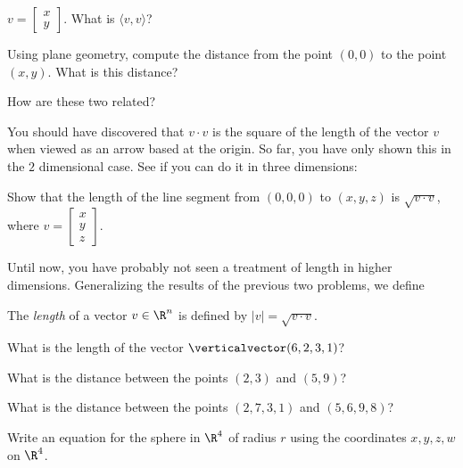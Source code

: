 \begin{question}
	$v  = \begin{bmatrix}  x  \\ y\end{bmatrix}$.  What is $\langle v,v\rangle$?  
	
	Using plane geometry, compute the distance from the point $(0,0)$ to the point $(x,y)$.  What is this distance?
	
	How are these two related?
\end{question}

You should have discovered that $v\cdot v$ is the square of the length of the vector $v$ when viewed as an arrow based at the origin.  So far, you have only shown this in the 
$2$ dimensional case.  See if you can do it in three dimensions:

\begin{problem}
	Show that the length of the line segment from $(0,0,0)$ to $(x,y,z)$ is $\sqrt{v \cdot v}$, where $v  = \begin{bmatrix}  x  \\ y \\ z\end{bmatrix}$.
\end{problem}

Until now, you have probably not seen a treatment of length in higher dimensions.  Generalizing the results of the previous two problems, we define

\begin{definition}
	The \textit{length} of a vector $v \in \R^n$ is defined by $|v| = \sqrt{v \cdot v}$.
\end{definition}

\begin{question}
	What is the length of the vector $\verticalvector(6,2,3,1)$?
\end{question}

\begin{question}
	What is the distance between the points $(2,3)$ and $(5,9)$?
\end{question}

\begin{question}
	What is the distance between the points $(2,7,3,1)$ and $(5,6,9,8)$?
\end{question}

\begin{question}
	Write an equation for the sphere in $\R^4$ of radius $r$ using the coordinates $x,y,z,w$ on $\R^4$.
\end{question}

